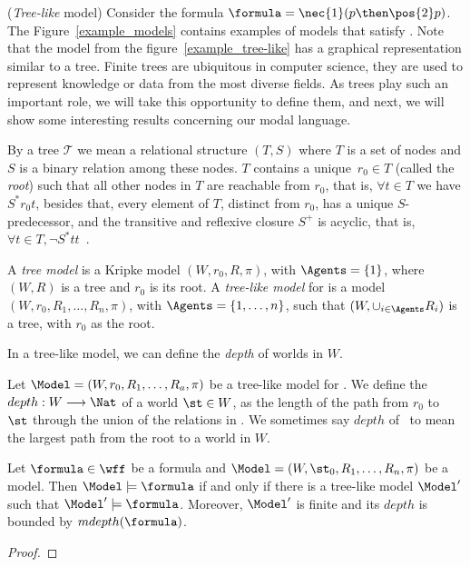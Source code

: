 \begin{example}
    \label{ex2}
    (\emph{Tree-like} model) 
    Consider the formula $\formula = \nec{1} (p \then \pos{2} p)$. The
    Figure~\ref{example_models} contains examples of models that satisfy
    \formula. Note that the model from the figure~\ref{example_tree-like} has a
    graphical representation similar to a tree. Finite trees are ubiquitous in
    computer science, they are used to represent knowledge or data from the most
    diverse fields. As trees play such an important role, we will take this
    opportunity to define them, and next, we will show some interesting results
    concerning our modal language.


 
    By a tree $\mathcal{T}$ we mean a relational structure $(T, S)$ where $T$ is
    a set of nodes and $S$ is a binary relation among these nodes. $T$
    contains a unique~$r_0 \in T$ (called the \emph{root}) such that all
    other nodes in $T$ are reachable from $r_0$, that is, $\forall t \in T$
    we have $S^*r_0 t$, besides that, every element of $T$, distinct from
    $r_0$, has a unique $S$-predecessor, and the transitive and reflexive
    closure $S^+$ is
    acyclic, that is, $\forall t \in T, \neg S^* t t$~\cite{areces2000tree}.

    A \emph{tree model} is a Kripke model $(W, r_0, R, \pi)$, with $\Agents =
    \{1\}$, where $(W, R)$ is a tree and $r_0$ is its root. A \emph{tree-like
    model} for  is a model $(W, r_0, R_1, \ldots, R_n, \pi)$,
    with $\Agents = \{1, \ldots, n\}$, such that $(W, \cup_{i \in \Agents} R_i)$
    is a tree, with $r_0$ as the root.

    In a tree-like model, we can define the \emph{depth} of worlds in $W$.

    \begin{definition}
        Let $\Model = (W, r_0, R_1, \ldots, R_a, \pi)$ be a tree-like model
        for . We define the $depth: W \longrightarrow \Nat$ of a
        world $\st \in W$, as the length of the path from $r_0$ to $\st$
        through the union of the relations in \Model. We sometimes say $depth$
        of \Model~to mean the largest path from the root to a world in $W$.
    \end{definition}

    \begin{theorem}
        Let $\formula \in \wff$ be a formula and $\Model = (W, \st_0, R_1,
        \ldots, R_n, \pi)$ be a model. Then $\Model \models \formula$ if and only if
        there is a tree-like model $\Model'$ such that $\Model' \models \formula$.
        Moreover, $\Model'$ is finite and its $depth$ is bounded by
        $mdepth(\formula)$.
    \end{theorem}
    \begin{proof}
    \end{proof}


\end{example}

